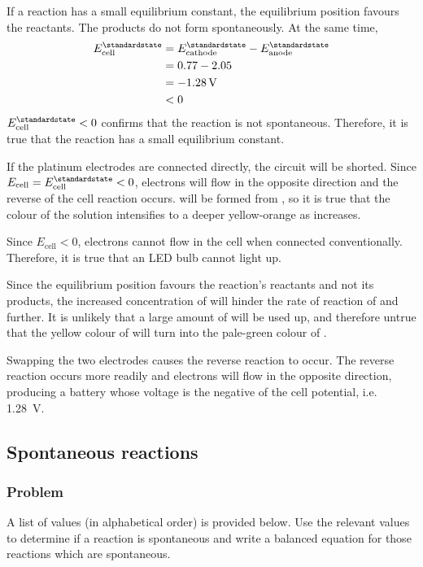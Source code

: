 If a reaction has a small equilibrium constant, the equilibrium position favours
the reactants. The products do not form spontaneously. At the same time,
\begin{align*}
	E^\standardstate_\text{cell} & = E^\standardstate_\text{cathode} - E^\standardstate_\text{anode} \\
	                             & = 0.77 - 2.05                                                     \\
	                             & = \qty{-1.28}{\volt}                                              \\
	                             & < 0
\end{align*}
\(E^\standardstate_\text{cell} < 0\) confirms that the reaction is not spontaneous.
Therefore, it is {\color{accent} true} that the reaction has a small equilibrium
constant.

If the platinum electrodes are connected directly, the circuit will be shorted.
Since \(E_\text{cell} = E^\standardstate_\text{cell} < 0\), electrons will flow
in the opposite direction and the reverse of the cell reaction occurs. 
will be formed from , so it is {\color{accent} true} that the colour of the solution
intensifies to a deeper yellow-orange as \ch{[Fe^{3+}]} increases.

Since \(E_\text{cell} < 0\), electrons cannot flow in the cell when connected
conventionally. Therefore, it is {\color{accent} true} that an LED bulb cannot
light up.

Since the equilibrium position favours the reaction's reactants and not its
products, the increased concentration of  will hinder
the rate of reaction of  and  further.
It is unlikely that a large amount of  will be used up, and
therefore {\color{accent} untrue} that the yellow colour of 
will turn into the pale-green colour of .

Swapping the two electrodes causes the reverse reaction to occur. The reverse
reaction occurs more readily and electrons will flow in the opposite direction,
producing a battery whose voltage is the negative of the cell potential, i.e.
\qty{1.28}{\volt}.

\subsection{Spontaneous reactions}
\subsubsection{Problem}
A list of values (in alphabetical order) is provided below. Use the relevant values to
determine if a reaction is spontaneous and write a balanced equation for those reactions
which are spontaneous.

